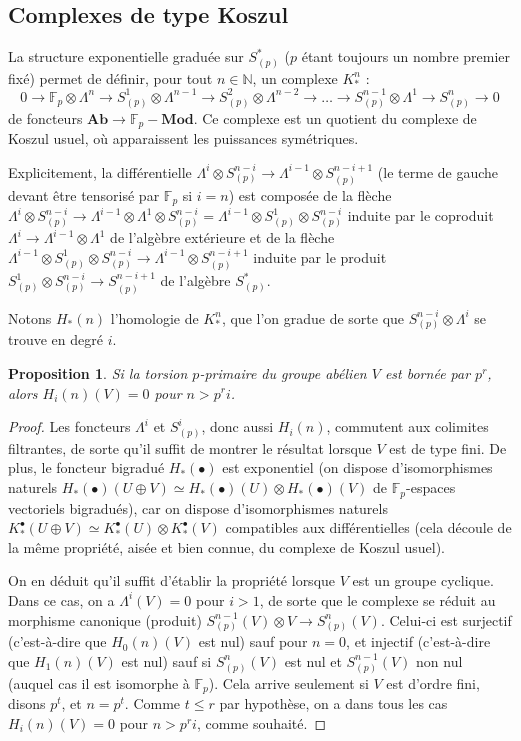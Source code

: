 \documentclass[a4paper,10pt]{article}
\newtheorem{pr}[thm]{Proposition}
\theoremstyle{definition}
\theoremstyle{remark}
\begin{document}
\subsection{Complexes de type Koszul}

La structure exponentielle graduée sur $S^*_{(p)}$ ($p$ étant toujours un nombre premier fixé) permet de définir, pour tout $n\in\mathbb{N}$, un complexe $K^n_*$ :
$$0\to\mathbb{F}_p\otimes\Lambda^n\to S^1_{(p)}\otimes\Lambda^{n-1}\to S^2_{(p)}\otimes\Lambda^{n-2}\to\dots\to S^{n-1}_{(p)}\otimes\Lambda^1\to S^n_{(p)}\to 0$$
de foncteurs $\mathbf{Ab}\to\mathbb{F}_p-\mathbf{Mod}$. Ce complexe est un quotient du complexe de Koszul usuel, où apparaissent les puissances symétriques.

Explicitement, la différentielle $\Lambda^i\otimes S^{n-i}_{(p)}\to\Lambda^{i-1}\otimes S^{n-i+1}_{(p)}$ (le terme de gauche devant être tensorisé par $\mathbb{F}_p$ si $i=n$) est composée de la flèche $\Lambda^i\otimes S^{n-i}_{(p)}\to\Lambda^{i-1}\otimes\Lambda^1\otimes S^{n-i}_{(p)}=\Lambda^{i-1}\otimes S^1_{(p)}\otimes S^{n-i}_{(p)}$ induite par le coproduit $\Lambda^i\to\Lambda^{i-1}\otimes\Lambda^1$ de l'algèbre extérieure et de la flèche $\Lambda^{i-1}\otimes S^1_{(p)}\otimes S^{n-i}_{(p)}\to\Lambda^{i-1}\otimes S^{n-i+1}_{(p)}$ induite par le produit $S^1_{(p)}\otimes S^{n-i}_{(p)}\to S^{n-i+1}_{(p)}$ de l'algèbre $S^*_{(p)}$.

Notons $H_*(n)$ l'homologie de $K^n_*$, que l'on gradue de sorte que $S^{n-i}_{(p)}\otimes\Lambda^i$
se trouve en degré $i$.

\begin{pr}\label{kosz}
 Si la torsion $p$-primaire du groupe abélien $V$ est bornée par $p^r$, alors $H_i(n)(V)=0$ pour $n>p^r i$.
\end{pr}

\begin{proof}
 Les foncteurs $\Lambda^i$ et $S^i_{(p)}$, donc aussi $H_i(n)$, commutent aux colimites filtrantes, de sorte qu'il suffit de montrer le résultat lorsque $V$ est de type fini. De plus, le foncteur bigradué $H_*(\bullet)$ est exponentiel (on dispose d'iso\-morphismes naturels $H_*(\bullet)(U\oplus V)\simeq H_*(\bullet)(U)\otimes H_*(\bullet)(V)$ de $\mathbb{F}_p$-espaces vectoriels bigradués), car on dispose d'isomorphismes naturels $K^\bullet_*(U\oplus V)\simeq K^\bullet_*(U)\otimes K^\bullet_*(V)$ compatibles aux différentielles (cela découle de la même propriété, aisée et bien connue, du complexe de Koszul usuel).

On en déduit qu'il suffit d'établir la propriété lorsque $V$ est un groupe cyclique. Dans ce cas, on a $\Lambda^i(V)=0$ pour $i>1$, de sorte que le complexe se réduit au morphisme canonique (produit) $S^{n-1}_{(p)}(V)\otimes V\to S^n_{(p)}(V)$. Celui-ci est surjectif (c'est-à-dire que $H_0(n)(V)$ est nul) sauf pour $n=0$, et injectif (c'est-à-dire que $H_1(n)(V)$ est nul) sauf si $S^n_{(p)}(V)$ est nul et $S^{n-1}_{(p)}(V)$ non nul (auquel cas il est isomorphe à $\mathbb{F}_p$). Cela arrive seulement si $V$ est d'ordre fini, disons $p^t$, et $n=p^t$. Comme $t\leq r$ par hypothèse, on a dans tous les cas $H_i(n)(V)=0$ pour $n>p^r i$, comme souhaité.
\end{proof}
\end{document}
